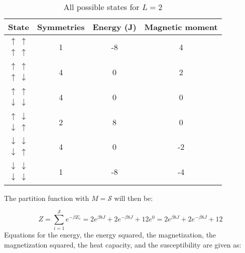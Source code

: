 \documentclass{article}
\begin{document}
\begin{table}[htb]
\begin{center}
\begin{tabular}{cccc}
    State & Symmetries & Energy (J) & Magnetic moment \\ \hline
    $ \begin{array}{cc}
        \uparrow&\uparrow \\
        \uparrow&\uparrow
    \end{array} $ &
    1 & -8 & 4
    \\ \hline
    $ \begin{array}{cc}
        \uparrow&\uparrow \\
        \uparrow&\downarrow
    \end{array} $ &
    4 & 0 & 2
    \\ \hline
    $ \begin{array}{cc}
        \uparrow&\uparrow \\
        \downarrow&\downarrow
    \end{array} $ &
    4 & 0 & 0
    \\ \hline
    $ \begin{array}{cc}
        \uparrow&\downarrow \\
        \downarrow&\uparrow
    \end{array} $ &
    2 & 8 & 0
    \\ \hline
    $ \begin{array}{cc}
        \downarrow&\downarrow \\
        \downarrow&\uparrow
    \end{array} $ &
    4 & 0 & -2
    \\ \hline
    $ \begin{array}{cc}
        \downarrow&\downarrow \\
        \downarrow&\downarrow
    \end{array} $ &
    1 & -8 & -4
    \\ \hline
\end{tabular}
\end{center}
\caption{All possible states for $L=2$}
\label{table:states}
\end{table}
The partition function with $M = \mathcal{S}$ will then be:

\begin{equation*}
    Z = \sum_{i=1}^{\mathcal{S}} e^{-\beta E_i} = 2 e^{\beta 8J} + 2 e^{-\beta 8J} + 12 e^0 = 2 e^{\beta 8J} + 2 e^{-\beta 8J} + 12
\end{equation*}
Equations for the energy, the energy squared, the magnetization, the magnetization squared, the heat capacity, and the susceptibility are given as:
\end{document}
